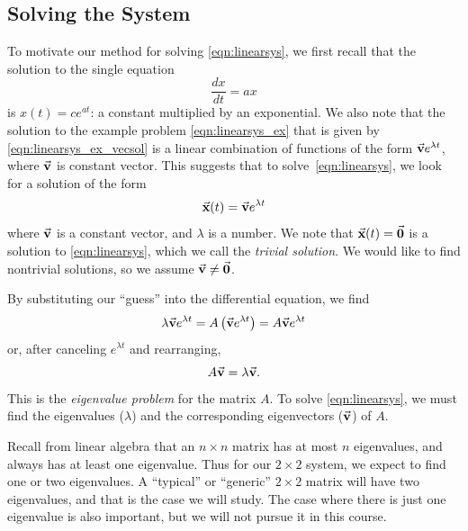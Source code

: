 \subsection*{Solving the System}
To motivate our method for
solving \eqref{eqn:linearsys},
we first recall that the solution to the
single equation
\begin{equation}
  \frac{dx}{dt} = a x
\end{equation}
is $x(t) = c e^{at}$: a constant multiplied by
an exponential.  We also 
note that the solution to
the example problem \eqref{eqn:linearsys_ex} that is given
by \eqref{eqn:linearsys_ex_vecsol} is a linear combination of functions
of the form $\vec{\textbf{v}} e^{\lambda t}$, where $\vec{\textbf{v}}$ is constant vector.
This suggests that to solve~\eqref{eqn:linearsys},
we look for a solution of the form
\begin{equation}
  \vec{\textbf{x}}(t) = \vec{\textbf{v}} e^{\lambda t}
\end{equation}
where $\vec{\textbf{v}}$ is a constant vector, and $\lambda$ is a number.
We note that $\vec{\textbf{x}}(t) = \vec{\textbf{0}}$ is a solution to \eqref{eqn:linearsys},
which we call the \emph{trivial solution}.
We would like to
find nontrivial solutions, so we assume $\vec{\textbf{v}}\ne \vec{\textbf{0}}$.

By substituting our ``guess'' into the differential equation, we
find
\begin{equation}
  \lambda \vec{\textbf{v}} e^{\lambda t} = A\left(\vec{\textbf{v}} e^{\lambda t}\right)
       = A\vec{\textbf{v}} e^{\lambda t}
\end{equation}
or, after canceling $e^{\lambda t}$ and rearranging,
\begin{equation}
   A\vec{\textbf{v}} = \lambda \vec{\textbf{v}}.
\label{eqn:eigenvalueprob}
\end{equation}
This is the \emph{eigenvalue problem}
for the matrix $A$.
To solve \eqref{eqn:linearsys}, we must find
the eigenvalues ($\lambda$) and
the corresponding eigenvectors ($\vec{\textbf{v}}$) of $A$.

Recall from linear algebra that an $n\times n$ matrix
has at most $n$ eigenvalues, and always has at least
one eigenvalue.  Thus for our $2\times 2$
system, we expect to find one or two eigenvalues.
A ``typical'' or ``generic'' $2\times 2$ matrix
will have two eigenvalues, and that is the case
we will study.  The case where there is just one
eigenvalue is also important, but we will not pursue
it in this course.

